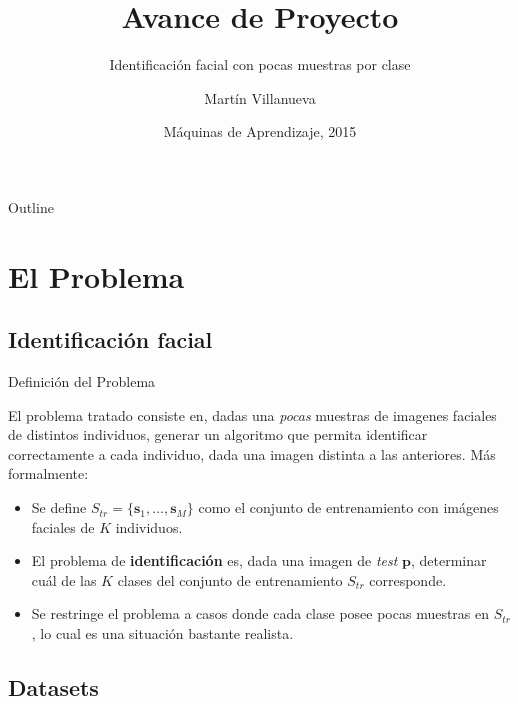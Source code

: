 \documentclass{beamer}
\title{Avance de Proyecto}
\subtitle{Identificación facial con pocas muestras por clase}
\author{Martín Villanueva\inst{1}}
\institute[Universidad Técnica Federico Santa María] %
{
  \inst{1}%
  Departamento de Informática\\
  Universidad Técnica Federico Santa María}
\date{Máquinas de Aprendizaje, 2015}
\begin{document}
\begin{frame}
  \titlepage
\end{frame}



\begin{frame}{Outline}
  \tableofcontents
\end{frame}




\section{El Problema}
\subsection{Identificación facial}

\begin{frame}{Definición del Problema}

El problema tratado consiste en, dadas una \textit{pocas} muestras de imagenes faciales de distintos individuos, generar un algoritmo que permita identificar correctamente a cada individuo, dada una imagen distinta a las anteriores. Más formalmente:

\begin{itemize}
 \item Se define $S_{tr} =  \{\mathbf{s}_1 , \ldots, \mathbf{s}_M \}$ como el conjunto de entrenamiento con imágenes faciales de $K$ individuos. 
 \item El problema de \textbf{identificación} es, dada una imagen de \textit{test} $\mathbf{p}$, determinar cuál de las $K$ clases del conjunto de entrenamiento $S_{tr}$ corresponde.
 \item Se restringe el problema a casos donde cada clase posee pocas muestras en $S_{tr}$, lo cual es una situación bastante realista.
\end{itemize}
\end{frame}


\subsection{Datasets}
\end{document}
